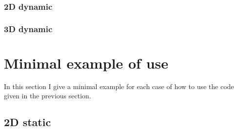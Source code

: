 \documentclass[12pt, a4paper]{article}
\begin{document}
\subsubsection{2D dynamic}


\begin{scriptsize}
\begin{ttfamily}

\end{ttfamily}
\end{scriptsize}


\begin{scriptsize}
\begin{ttfamily}

\end{ttfamily}
\end{scriptsize}

\subsubsection{3D dynamic}


\begin{scriptsize}
\begin{ttfamily}

\end{ttfamily}
\end{scriptsize}


\begin{scriptsize}
\begin{ttfamily}

\end{ttfamily}
\end{scriptsize}

\section{Minimal example of use}

In this section I give a minimal example for each case of how to use the code given in the previous section.

\subsection{2D static}
\end{document}
